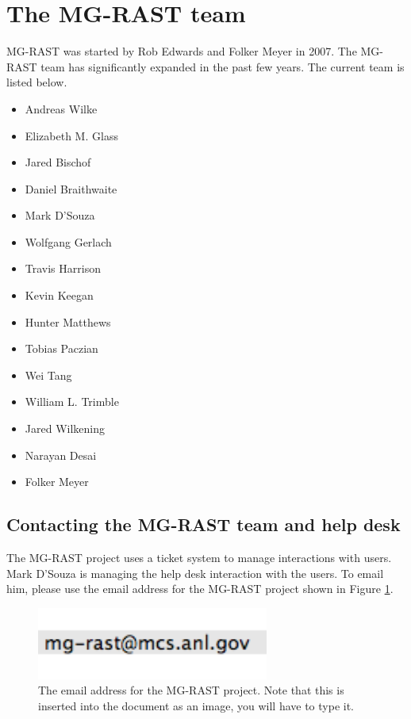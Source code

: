 \documentclass[12pt,fullpage]{report}
\begin{document}
\section{The MG-RAST team}
MG-RAST was started by Rob Edwards and Folker Meyer in 2007.
The MG-RAST team has significantly expanded in the past few years.
The current team is listed below.
\begin{itemize}
\item Andreas Wilke
\item Elizabeth M. Glass
\item Jared Bischof
\item Daniel Braithwaite
\item Mark D’Souza
\item Wolfgang Gerlach
\item Travis Harrison
\item Kevin Keegan
\item Hunter Matthews
\item Tobias Paczian
\item Wei Tang
\item William L. Trimble
\item Jared Wilkening
\item Narayan Desai
\item Folker Meyer
\end{itemize}
\subsection*{Contacting the MG-RAST team and help desk}

The MG-RAST project uses a ticket system to manage interactions with users.
Mark D'Souza is managing the help desk interaction with the users.
To email him, please use the email address for the MG-RAST project shown in Figure \ref{fig:mgrastemail}.

\begin{figure}
\begin{center}
\includegraphics[width=3in]{Images/mgrastemail.png}
\end{center}
\caption{
The email address for the MG-RAST project. Note that this is inserted into the document as an image, you will have to type it.
}
\label{fig:mgrastemail}
\end{figure}
\end{document}
